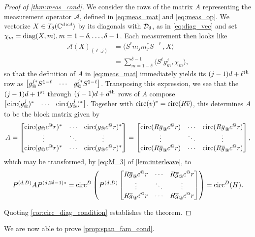 \begin{proof}[Proof of \cref{thm:meas_cond}]
  We consider the rows of the matrix $A$ representing the measurement operator $\mathcal{A}$, defined in \eqref{eq:meas_mat} and \eqref{eq:meas_op}.  We vectorize $X \in T_\delta(\mathbb{C}^{d \times d})$ by its diagonals with $\mathcal{D}_\delta$, as in \eqref{eq:diag_vec} and set $\chi_m = \operatorname{diag}(X, m), m = 1 - \delta, \ldots, \delta - 1$.  Each measurement then looks like
  \begin{align*}
    \mathcal{A}(X)_{(\ell, j)} &= \langle S^{\ell} m_j m_j^* S^{-\ell}, X \rangle \\
    &= \sum_{m = 1 - \delta}^{\delta - 1} \langle S^{\ell} g_m^j, \chi_m \rangle,
  \end{align*}
  so that the definition of $A$ in \eqref{eq:meas_mat} immediately yields its $(j - 1) d + \ell^{\text{th}}$ row as $\rowmatfun{g_@^{j*} S^{1 - \ell}}{1 - \delta}{\delta - 1}$.  Transposing this expression, we see that the $(j - 1)d + 1^{\text{st}}$ through $(j - 1) d + d^{\text{th}}$ rows of $A$ compose $\rowmatfun{\circop(g^j_@)^*}{1 - \delta}{\delta - 1}$. %
  Together with $\operatorname{circ}(v)^* = \operatorname{circ}(R \overline{v})$, this determines $A$ to be the block matrix given by \[A = \cornmatfun{\circop(g_@c^@r)^*}{1}{D}{1 - \delta}{\delta - 1} = \cornmatfunexp{\circop(R \conj{g}_@c^@r)}{1}{D}{1 - \delta}{\delta - 1},\] which may be transformed, by \eqref{eq:M_3} of \cref{lem:interleave}, to
  \begin{equation}
    P^{(d, D)} A P^{(d, 2 \delta - 1)*} = \circop^D\left(P^{(d, D)} \cornmatfun{R \conj{g}_@c^@r}{1}{D}{1 - \delta}{\delta - 1} \right) = \circop^D(H).
    \label{eq:interleaved_meas}
  \end{equation}

Quoting \cref{cor:circ_diag_condition} establishes the theorem.
\end{proof}

We are now able to prove \cref{prop:span_fam_cond}.

